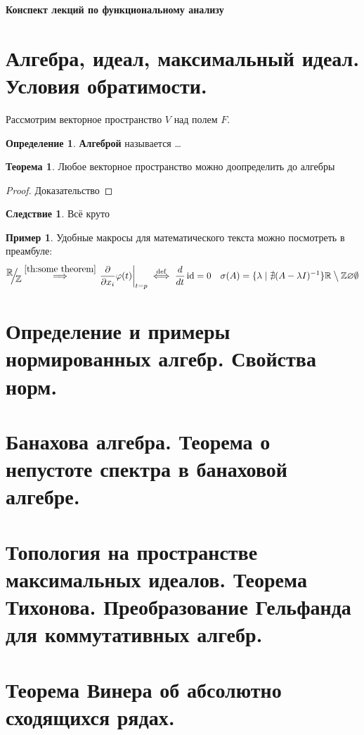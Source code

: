 \documentclass[12pt]{extarticle}
\renewcommand{\setminus}{\mathbin{\big\backslash}}%
\theoremstyle{definition}
\newtheorem{theorem}{\indent Теорема}[section]
\newtheorem{corollary}{\indent Следствие}%
\newtheorem{definition}{\indent Определение}[section]
\newtheorem{example}{\indent Пример}%
\newcommand{\factor}[2]{\raisebox{.35em}{$#1$}\kern-.27em\Big/\kern-.27em\raisebox{-.35em}{$#2$}}
\newcommand{\RR}{\mathbb{R}}
\newcommand{\ZZ}{\mathbb{Z}}
\newcommand{\bb}[1]{\mathbb{#1}}
\newcommand{\implby}[1]{\stackrel{\mathrm{#1}}{\implies}}
\newcommand{\ddt}{\frac{d}{dt}}
\newcommand{\iffdef}{\stackrel{\mathrm{def}}{\iff}}
\newcommand{\at}[2]{\left.#1\right\vert_{#2}}
\newcommand{\partiald}[2]{\frac{\partial #1}{\partial #2}}
\DeclareMathOperator{\id}{id}
\begin{document}
    \begin{titlepage}
        \null
        \vfill
        \centering\Huge\bfseries Конспект лекций по функциональному анализу
        \vfill
        \null
    \end{titlepage}
    \tableofcontents
    \newpage
    \section{Алгебра, идеал, максимальный идеал. Условия обратимости.}
    Рассмотрим векторное пространство $V$ над полем $F$.
    \begin{definition}
        \textbf{Алгеброй} называется \dots
    \end{definition}
    \begin{theorem}\label{th:some theorem}
        Любое векторное пространство можно доопределить до алгебры
    \end{theorem}
    \begin{proof}
        Доказательство
    \end{proof}
    \begin{corollary}
        Всё круто
    \end{corollary}
    \begin{example}
        Удобные макросы для математического текста можно посмотреть в преамбуле:
        $$
        \factor{\RR}{\bb Z} \implby{\ref{th:some theorem}} \at{\partiald{}{x_i}\varphi(t)}{t=p} \iffdef \ddt\id=0 \quad \sigma(A) = \{\lambda\mid\nexists(A-\lambda I)^{-1}\} \RR\setminus\ZZ \varnothing \emptyset
        $$
    \end{example}
    \section{Определение и примеры нормированных алгебр. Свойства норм.}

    \section{Банахова алгебра. Теорема о непустоте спектра в банаховой алгебре.}

    \section{Топология на пространстве максимальных идеалов. Теорема Тихонова. Преобразование Гельфанда для коммутативных алгебр.}

    \section{Теорема Винера об абсолютно сходящихся рядах.}
\end{document}
